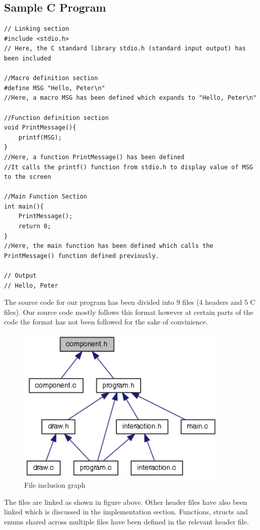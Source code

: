\documentclass[report]{subfiles}
\begin{document}
    \subsection{Sample C Program}
    \begin{mdframed}[backgroundcolor=bg]
\begin{verbatim}
// Linking section
#include <stdio.h>
// Here, the C standard library stdio.h (standard input output) has been included

//Macro definition section
#define MSG "Hello, Peter\n"
//Here, a macro MSG has been defined which expands to "Hello, Peter\n"

//Function definition section
void PrintMessage(){
    printf(MSG);
}
//Here, a function PrintMessage() has been defined
//It calls the printf() function from stdio.h to display value of MSG to the screen

//Main Function Section
int main(){
    PrintMessage();
    return 0;
}
//Here, the main function has been defined which calls the PrintMessage() function defined previously.

// Output
// Hello, Peter
\end{verbatim}
    \end{mdframed}
    The source code for our program has been divided into 9 files (4 headers and 5 C files). Our source code mostly follows this format however at certain parts of the code the format has not been followed for the sake of convinience.
    \begin{figure}[H]
        \centering
        \includegraphics[width=4in]{graphics/component_8h__dep__incl.png}
        \caption{File inclusion graph}
    \end{figure}
    The files are linked as shown in figure above. Other header files have also been linked which is discussed in the implementation section. Functions, structs and enums shared across multiple files have been defined in the relevant header file.
\end{document}
